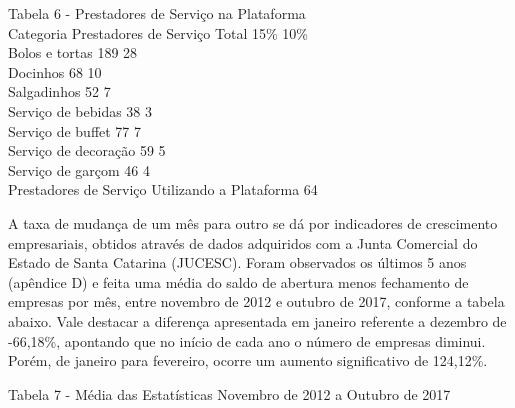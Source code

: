 \begin{commentB}
	Tabela 6 - Prestadores de Serviço na Plataforma \\
	Categoria Prestadores de 
	Serviço Total 15\% 10\% \\
	Bolos e tortas 189 28 \\
	Docinhos 68 10 \\
	Salgadinhos 52 7 \\
	Serviço de bebidas 38 3  \\
	Serviço de buffet 77 7 \\
	Serviço de decoração 59 5 \\
	Serviço de garçom 46 4 \\
	Prestadores de Serviço Utilizando a Plataforma 64 \\
	\par \end{commentB}




A taxa de mudança de um mês para outro se dá por indicadores de crescimento 
empresariais, obtidos através de dados adquiridos com a Junta Comercial do Estado 
de Santa Catarina (JUCESC). Foram observados os últimos 5 anos (apêndice D) e 
feita uma média do saldo de abertura menos fechamento de empresas por mês, entre 
novembro de 2012 e outubro de 2017, conforme a tabela abaixo. Vale destacar a 
diferença apresentada em janeiro referente a dezembro de -66,18\%, apontando que 
no início de cada ano o número de empresas diminui. Porém, de janeiro para fevereiro, 
ocorre um aumento significativo de 124,12\%. \par

\begin{commentB}
	Tabela 7 - Média das Estatísticas Novembro de 2012 a Outubro de 2017
	\par \end{commentB}
